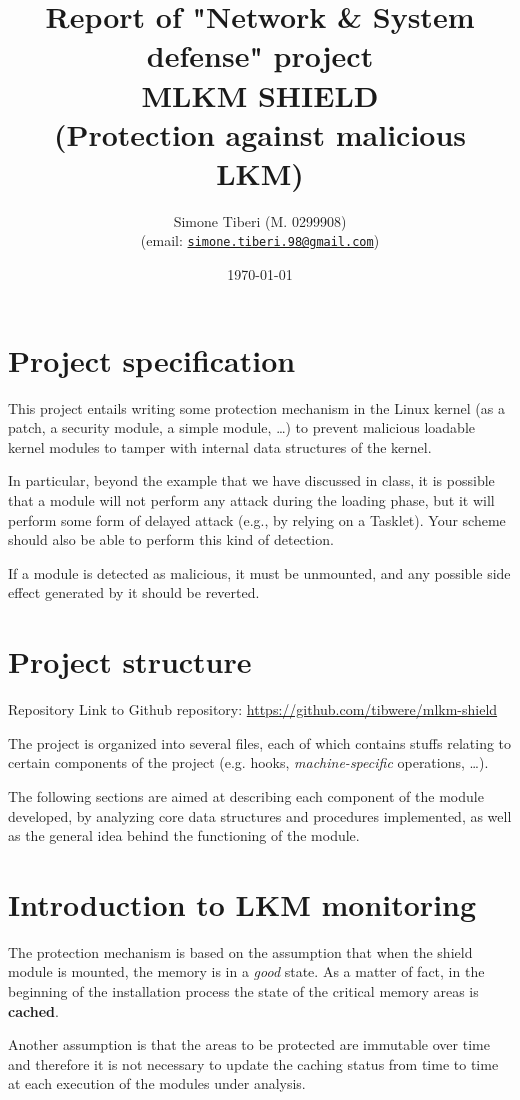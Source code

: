 \documentclass{article}
\title{\small Report of "Network \& System defense" project \\
\Huge \textbf{MLKM SHIELD}\\
\Large (Protection against malicious LKM)}
\author{Simone Tiberi (M. 0299908)\\%
(email: \texttt{\href{mailto:simone.tiberi.98@gmail.com}{simone.tiberi.98@gmail.com}})}
\date{\today}
\begin{document}
\maketitle
	\section{Project specification}
	This project entails writing some protection mechanism in the Linux kernel (as a patch, a security module, a simple
	module, \dots) to prevent malicious loadable kernel modules to tamper with internal data structures of the kernel.

	In particular, beyond the example that we have discussed in class, it is possible that a module will not perform
	any attack during the loading phase, but it will perform some form of delayed attack (e.g., by relying on a
	Tasklet). Your scheme should also be able to perform this kind of detection.

	If a module is detected as malicious, it must be unmounted, and any possible side effect generated by it should be
	reverted.

	\section{Project structure}
	\begin{custombox}{Repository}
		Link to Github repository: \url{https://github.com/tibwere/mlkm-shield}
	\end{custombox}

	The project is organized into several files, each of which contains stuffs relating to certain components of the
	project (e.g. hooks, \textit{machine-specific} operations, \dots).

	The following sections are aimed at describing each component of the module developed, by analyzing core data
	structures and procedures implemented, as well as the general idea behind the functioning of the module.

	\section{Introduction to LKM monitoring}
	The protection mechanism is based on the assumption that when the shield module is mounted, the memory is in a
	\textit{good} state. As a matter of fact, in the beginning of the installation process the state of the critical
	memory areas is \textbf{cached}.

	Another assumption is that the areas to be protected are immutable over time and therefore it is not necessary to
	update the caching status from time to time at each execution of the modules under analysis.
\end{document}
